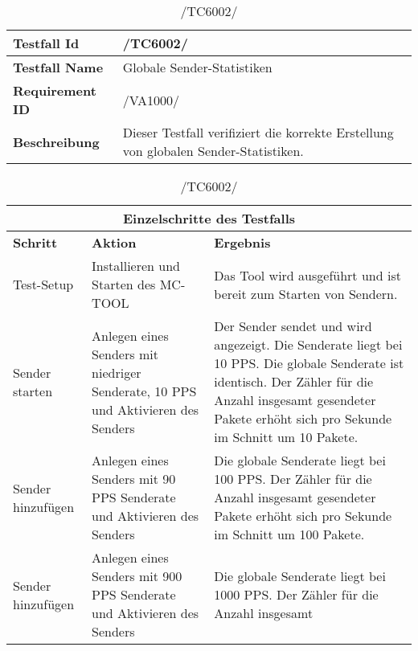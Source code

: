    \begin{table}[h]
        \caption{/TC6002/}
        \label{tab:TC6002}
        \begin{center}
            \begin{tabular}{|p{3.5cm}|p{12cm}|}
                \hline
                    \textbf{Testfall Id} & /TC6002/\\
                \hline
                    \textbf{Testfall Name} & Globale Sender-Statistiken\\
                \hline
                    \textbf{Requirement ID} & /VA1000/\\
                \hline
                    \textbf{Beschreibung} & Dieser Testfall verifiziert die
                    korrekte Erstellung von globalen Sender-Statistiken.\\
                \hline
            \end{tabular}
            \begin{tabular}{|p{2.5cm}|p{5cm}|p{7.55cm}|}
                \multicolumn{3}{|c|}{\textbf{Einzelschritte des Testfalls}} \\
                \hline
                    \textbf{Schritt} & \textbf{Aktion} & \textbf{Ergebnis}\\
                \hline
                    Test-Setup & Installieren und Starten des MC-TOOL & Das Tool
                    wird ausgeführt und ist bereit zum Starten von Sendern. \\
                \hline
                    Sender starten & Anlegen eines Senders mit niedriger
                    Senderate, 10 PPS und Aktivieren des Senders & Der Sender
                    sendet und wird angezeigt. Die Senderate liegt bei 10 PPS.
                    Die globale Senderate ist identisch. Der Zähler für die
                    Anzahl insgesamt gesendeter Pakete erhöht sich pro Sekunde
                    im Schnitt um 10 Pakete.\\
                \hline
                    Sender hinzufügen & Anlegen eines Senders mit 90 PPS
                    Senderate und Aktivieren des Senders & Die globale Senderate
                    liegt bei 100 PPS. Der Zähler für die Anzahl insgesamt
                    gesendeter Pakete erhöht sich pro Sekunde im Schnitt um 100
                    Pakete.\\
                \hline
                    Sender hinzufügen & Anlegen eines Senders mit 900 PPS
                    Senderate und Aktivieren des Senders & Die globale Senderate
                    liegt bei 1000 PPS. Der Zähler für die Anzahl insgesamt

\end{tabular}
\end{center}
\end{table}
